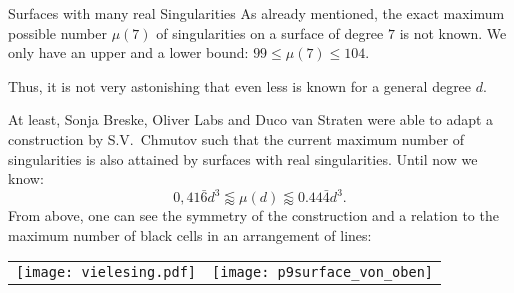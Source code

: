 \begin{surferPage}[216 Singularities]{Surfaces with many real Singularities}
    As already mentioned, the exact maximum possible number
    $\mu(7)$ of singularities on a surface of degree $7$ is not known.
    We only have an upper and a lower bound: $99\le \mu(7) \le 104$. 


    Thus, it is not very astonishing that even less is known for a general degree $d$. 

    At least, Sonja Breske, Oliver Labs and Duco van Straten were able to adapt a
    construction by S.V.\ Chmutov such that the current maximum
    number of singularities is also attained by surfaces with real
    singularities. 
    Until now we know:
    \[0,41\bar{6}d^3 \lessapprox \mu(d) \lessapprox 0.44\bar{4} d^3.\]
     From above, one can see the symmetry of the construction and a relation to
    the maximum number of black cells in an arrangement of lines:
    \begin{center}
      \begin{tabular}{c@{\qquad}c}
        \texttt{[image: vielesing.pdf]}
        &
        \texttt{[image: p9surface\_von\_oben]}
      \end{tabular}
    \end{center}
\end{surferPage}
